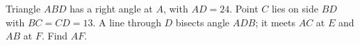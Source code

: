 Triangle $ABD$ has a right angle at $A$, with $AD=24$. Point $C$ lies on side $BD$ with $BC=CD=13$. A line through $D$ bisects angle $ADB$; it meets $AC$ at $E$ and $AB$ at $F$. Find $AF$.

